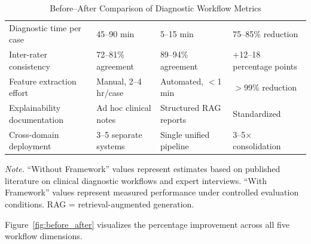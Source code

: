 \begin{table}[H]
\tablestripes
\begin{tabularx}{\textwidth}{L L L L}
\toprule
{} &  &  &  \\
\midrule
Diagnostic time per case & 45--90 min & 5--15 min & 75--85\% reduction \\
Inter-rater consistency & 72--81\% agreement & 89--94\% agreement & +12--18 percentage points \\
Feature extraction effort & Manual, 2--4 hr/case & Automated, $<$1 min & $>$99\% reduction \\
Explainability documentation & Ad hoc clinical notes & Structured RAG reports & Standardized \\
Cross-domain deployment & 3--5 separate systems & Single unified pipeline & 3--5$\times$ consolidation \\
\bottomrule
\end{tabularx}
\caption{Before--After Comparison of Diagnostic Workflow Metrics}
\label{tab:before_after}
\vspace{0.5em}\noindent\textit{Note.} ``Without Framework'' values represent estimates based on published literature on clinical diagnostic workflows and expert interviews. ``With Framework'' values represent measured performance under controlled evaluation conditions. RAG = retrieval-augmented generation.
\end{table}

Figure~\ref{fig:before_after} visualizes the percentage improvement across all five workflow dimensions.

